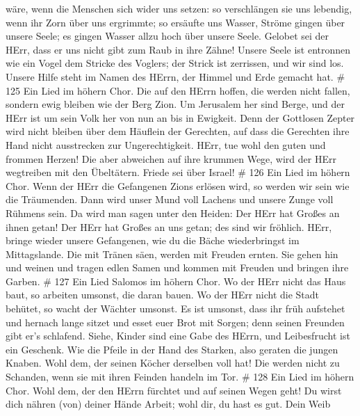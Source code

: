 wäre, wenn die Menschen sich wider uns setzen:  so
verschlängen sie uns lebendig, wenn ihr Zorn über uns ergrimmte;
 so ersäufte uns Wasser, Ströme gingen über unsere Seele;
 es gingen Wasser allzu hoch über unsere Seele. 
Gelobet sei der HErr, dass er uns nicht gibt zum Raub in ihre Zähne!
 Unsere Seele ist entronnen wie ein Vogel dem Stricke des
Voglers; der Strick ist zerrissen, und wir sind los.  Unsere
Hilfe steht im Namen des HErrn, der Himmel und Erde gemacht hat. \# 125
 Ein Lied im höhern Chor. Die auf den HErrn hoffen, die
werden nicht fallen, sondern ewig bleiben wie der Berg Zion.
 Um Jerusalem her sind Berge, und der HErr ist um sein Volk
her von nun an bis in Ewigkeit.  Denn der Gottlosen Zepter
wird nicht bleiben über dem Häuflein der Gerechten, auf dass die
Gerechten ihre Hand nicht ausstrecken zur Ungerechtigkeit. 
HErr, tue wohl den guten und frommen Herzen!  Die aber
abweichen auf ihre krummen Wege, wird der HErr wegtreiben mit den
Übeltätern. Friede sei über Israel! \# 126  Ein Lied im
höhern Chor. Wenn der HErr die Gefangenen Zions erlösen wird, so werden
wir sein wie die Träumenden.  Dann wird unser Mund voll
Lachens und unsere Zunge voll Rühmens sein. Da wird man sagen unter den
Heiden: Der HErr hat Großes an ihnen getan!  Der HErr hat
Großes an uns getan; des sind wir fröhlich.  HErr, bringe
wieder unsere Gefangenen, wie du die Bäche wiederbringst im
Mittagslande.  Die mit Tränen säen, werden mit Freuden
ernten.  Sie gehen hin und weinen und tragen edlen Samen und
kommen mit Freuden und bringen ihre Garben. \# 127  Ein Lied
Salomos im höhern Chor. Wo der HErr nicht das Haus baut, so arbeiten
umsonst, die daran bauen. Wo der HErr nicht die Stadt behütet, so wacht
der Wächter umsonst.  Es ist umsonst, dass ihr früh
aufstehet und hernach lange sitzet und esset euer Brot mit Sorgen; denn
seinen Freunden gibt er's schlafend.  Siehe, Kinder sind
eine Gabe des HErrn, und Leibesfrucht ist ein Geschenk.  Wie
die Pfeile in der Hand des Starken, also geraten die jungen Knaben.
 Wohl dem, der seinen Köcher derselben voll hat! Die werden
nicht zu Schanden, wenn sie mit ihren Feinden handeln im Tor. \# 128
 Ein Lied im höhern Chor. Wohl dem, der den HErrn fürchtet
und auf seinen Wegen geht!  Du wirst dich nähren (von)
deiner Hände Arbeit; wohl dir, du hast es gut.  Dein Weib
